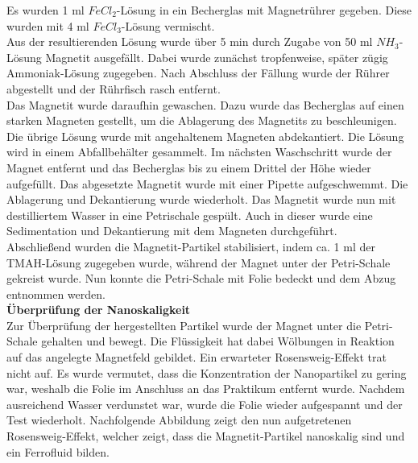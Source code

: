 \documentclass[a4paper]{TUBAFprotokoll}
\begin{document}
		Es wurden 1 ml $FeCl_2$-Lösung in ein Becherglas mit Magnetrührer gegeben. Diese wurden mit 4 ml $FeCl_3$-Lösung vermischt.\\
		Aus der resultierenden Lösung wurde über 5 min durch Zugabe von 50 ml $NH_3$-Lösung Magnetit ausgefällt. Dabei wurde zunächst tropfenweise, später zügig Ammoniak-Lösung zugegeben. Nach Abschluss der Fällung wurde der Rührer abgestellt und der Rührfisch rasch entfernt. \\
		Das Magnetit wurde daraufhin gewaschen. Dazu wurde das Becherglas auf einen starken Magneten gestellt, um die Ablagerung des Magnetits zu beschleunigen. Die übrige Lösung wurde mit angehaltenem Magneten abdekantiert. Die Lösung wird in einem Abfallbehälter gesammelt. Im nächsten Waschschritt wurde der Magnet entfernt und das Becherglas bis zu einem Drittel der Höhe wieder aufgefüllt. Das abgesetzte Magnetit wurde mit einer Pipette aufgeschwemmt. Die Ablagerung und Dekantierung wurde wiederholt. Das Magnetit wurde nun mit destilliertem Wasser in eine Petrischale gespült. Auch in dieser wurde eine Sedimentation und Dekantierung mit dem Magneten durchgeführt. \\
		Abschließend wurden die Magnetit-Partikel stabilisiert, indem ca. 1 ml der TMAH-Lösung zugegeben wurde, während der Magnet unter der Petri-Schale gekreist wurde. Nun konnte die Petri-Schale mit Folie bedeckt und dem Abzug entnommen werden. \\
		\newline
		\textbf{Überprüfung der Nanoskaligkeit}\\
		Zur Überprüfung der hergestellten Partikel wurde der Magnet unter die Petri-Schale gehalten und bewegt. Die Flüssigkeit hat dabei Wölbungen in Reaktion auf das angelegte Magnetfeld gebildet. Ein erwarteter Rosensweig-Effekt trat nicht auf. Es wurde vermutet, dass die Konzentration der Nanopartikel zu gering war, weshalb die Folie im Anschluss an das Praktikum entfernt wurde. Nachdem ausreichend Wasser verdunstet war, wurde die Folie wieder aufgespannt und der Test wiederholt. Nachfolgende Abbildung zeigt den nun aufgetretenen Rosensweig-Effekt, welcher zeigt, dass die Magnetit-Partikel nanoskalig sind und ein Ferrofluid bilden.
\end{document}
